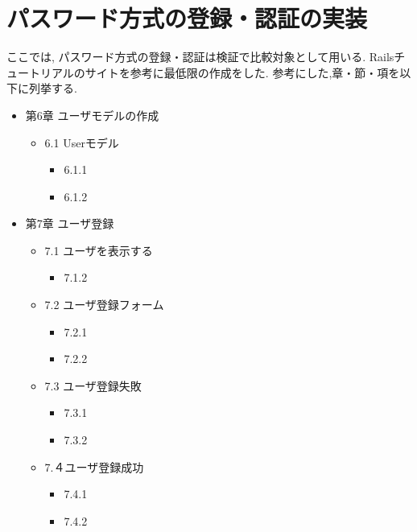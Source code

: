 \section{パスワード方式の登録・認証の実装}
ここでは,
パスワード方式の登録・認証は検証で比較対象として用いる.
Railsチュートリアルのサイト\cite{Rails tutorial}を参考に最低限の作成をした.
参考にした,章・節・項を以下に列挙する.
\begin{itemize}
    \item 第6章 ユーザモデルの作成
    \begin{itemize}
        \item 6.1 Userモデル
        \begin{itemize}
            \item 6.1.1
            \item 6.1.2
        \end{itemize}
    \end{itemize}

    \item 第7章 ユーザ登録
    \begin{itemize}
        \item 7.1 ユーザを表示する
        \begin{itemize}
            \item 7.1.2
        \end{itemize}
        \item 7.2 ユーザ登録フォーム
        \begin{itemize}
            \item 7.2.1
            \item 7.2.2
        \end{itemize}
        \item 7.3 ユーザ登録失敗
        \begin{itemize}
            \item 7.3.1
            \item 7.3.2
        \end{itemize}
        \item 7.４ユーザ登録成功
        \begin{itemize}
            \item 7.4.1
            \item 7.4.2
        \end{itemize}
    \end{itemize}


\end{itemize}
